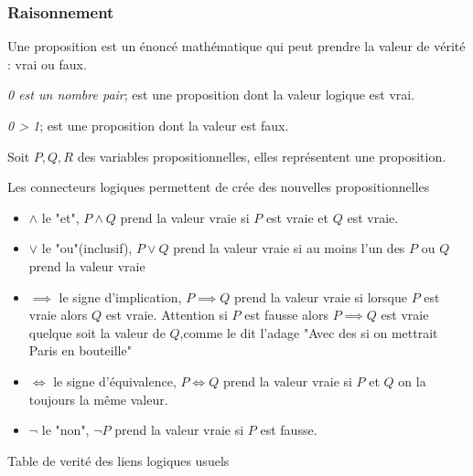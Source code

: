 \subsubsection{Raisonnement}
\label{lang}
\begin{defini}[Proposition]
    Une proposition est un énoncé mathématique qui peut prendre la valeur de vérité : vrai ou faux.
\end{defini}
\begin{ex}
    \textit{0 est un nombre pair}; est une proposition dont la valeur logique est vrai.

    \textit{0 > 1}; est une proposition dont la valeur est faux.
\end{ex}
Soit $P,Q,R$ des variables propositionnelles, elles représentent une proposition.
\begin{defini}
    Les connecteurs logiques permettent de crée des nouvelles propositionnelles
    \begin{itemize}

    \item $\land$ le "et", $P\land Q$ prend la valeur vraie si $P$ est vraie et $Q$ est vraie.

    \item $\vee$ le "ou"(inclusif), $P\vee Q$ prend la valeur vraie si au moins l'un des $P$ ou $Q$ prend la valeur vraie

    \item $\implies$ le signe d'implication, $P\implies Q$ prend la valeur vraie si lorsque $P$ est vraie alors $Q$ est vraie. Attention si $P$ est fausse alors $P\implies Q$ est vraie quelque soit la valeur de $Q$,comme le dit l'adage "Avec des si on mettrait Paris en bouteille"

    \item $\iff$ le signe d'équivalence, $P\iff Q$ prend la valeur vraie si $P$ et $Q$ on la toujours la même valeur.

    \item $\lnot$ le "non", $\lnot P$ prend la valeur vraie si $P$ est fausse.
    \end{itemize}
\end{defini}
Table de verité des liens logiques usuels 
